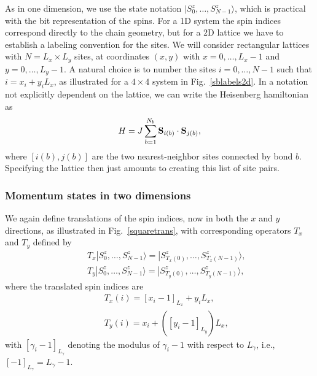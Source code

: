 \documentclass[draft,numberedheadings]{aipproc}
\begin{document}
As in one dimension, we use the state notation 
$|S^z_0,\ldots,S^z_{N-1}\rangle$, which is practical with the bit representation of the spins. For a 1D system the spin indices correspond directly to 
the chain geometry, but for a 2D lattice we have to establish a labeling convention for the sites. We will consider rectangular lattices with 
$N=L_x \times L_y$ sites, at coordinates $(x,y)$ with $x=0,\ldots,L_x-1$ and $y=0,\ldots,L_y-1$. A natural choice is to number the sites 
$i=0,\ldots,N-1$ such that $i=x_i+y_iL_x$, as illustrated for a $4\times 4$ system in Fig.~\ref{sblabels2d}. In a notation not explicitly 
dependent on the lattice, we can write the Heisenberg hamiltonian as
\begin{equation}
H=J\sum_{b=1}^{N_b} {\bf S}_{i(b)} \cdot {\bf S}_{j(b)},
\label{hbsum}
\end{equation}
where $[i(b),j(b)]$ are the two nearest-neighbor sites connected by bond $b$. Specifying the lattice then just amounts to creating this list of site pairs.

\subsubsection{Momentum states in two dimensions}

We again define translations of the spin indices, now in both the $x$ and $y$ directions, as illustrated
in Fig.~\ref{squaretrans}, with corresponding operators $T_x$ and $T_y$ defined by
\begin{eqnarray}
&&T_x|S^z_0,\ldots,S^z_{N-1}\rangle = |S^z_{T_x(0)},\ldots,S^z_{T_x(N-1)}\rangle,\nonumber\\
&&T_y|S^z_0,\ldots,S^z_{N-1}\rangle = |S^z_{T_y(0)},\ldots,S^z_{T_y(N-1)}\rangle,
\label{tdef2d}
\end{eqnarray}
where the translated spin indices are
\begin{eqnarray}
&& T_x(i)=[x_i-1]_{L_x}+y_iL_x,\nonumber \\
&& T_y(i)=x_i+([y_i-1]_{L_y})L_x,
\end{eqnarray}
with $[\gamma_i-1]_{L_\gamma}$ denoting the modulus of $\gamma_i-1$ with respect to $L_\gamma$, i.e., $[-1]_{L_\gamma}=L_\gamma-1$. 
\end{document}
